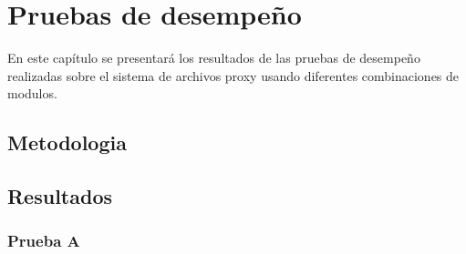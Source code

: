 \chapter{Pruebas de desempeño}
\label{desempeño}

En este capítulo se presentará los resultados de las pruebas de desempeño realizadas sobre el sistema de archivos proxy usando diferentes combinaciones de modulos.


\section{Metodologia}
\label{metodologia}


\section{Resultados}
\label{resultados}


\subsection{Prueba A}
\label{prueba_a}



